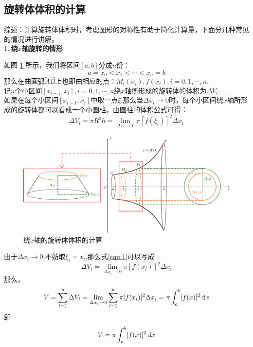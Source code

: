 \subsection{旋转体体积的计算}
综述：计算旋转体体积时，考虑图形的对称性有助于简化计算量，下面分几种常见的情况进行讲解。\\
\textbf{1.$\,$绕$x$轴旋转的情形}
\par 如图 \ref{x旋转} 所示，我们将区间$[a,b]$分成$n$份：
\begin{equation}
	\nonumber
	a=x_0<x_1<\cdots<x_n=b
\end{equation}
那么在曲面弧$\wideparen{AB}$上也即由相应的点：$M_i(x_i),f(x_i),i=0,1,\cdots,n$.\\
记$n$个小区间$[x_{i-1},x_i],i=0,1,\cdots,n$绕$x$轴所形成的旋转体的体积为$\Delta V_i$.\\
如果在每个小区间$[x_{i-1},x_i]$中取一点$\xi$,那么当$\Delta x_i\to0$时，每个小区间绕$x$轴所形成的旋转体都可以看成一个小圆柱，由圆柱的体积公式可得：
\begin{equation}
	\Delta V_i=\pi R^2 h=\lim\limits_{\Delta x_i\to0}\pi[f(\xi_i)]^2\Delta x_i
	\label{equ:1}
\end{equation}
\begin{figure}
	\centering
	\includegraphics[width=0.9\linewidth]{pic/C-4/x旋转体积}
	\vspace*{-1em}
	\caption{绕$x$轴的旋转体体积的计算}
	\label{x旋转}
\end{figure}
由于$\Delta x_i\to0$,不妨取$\xi_i=x_i$,那么式\eqref{equ:1}可以写成
\begin{equation}
	\Delta V_i=\lim\limits_{\Delta x_i\to0}\pi[f(x_i)]^2\Delta x_i
\end{equation}
那么，
\begin{equation}
	V=\sum_{i=1}^{n}\Delta V_i=\lim\limits_{\Delta x_i\to0}\sum_{i=1}^{n}\pi[f(x_i)]^2\Delta x_i=\pi\int_{a}^{b}[f(x)]^2\,{\rm{d}} x
\end{equation}
即
\begin{equation}
	V=\pi\int_{a}^{b}[f(x)]^2\,{\rm{d}} x
\end{equation}

